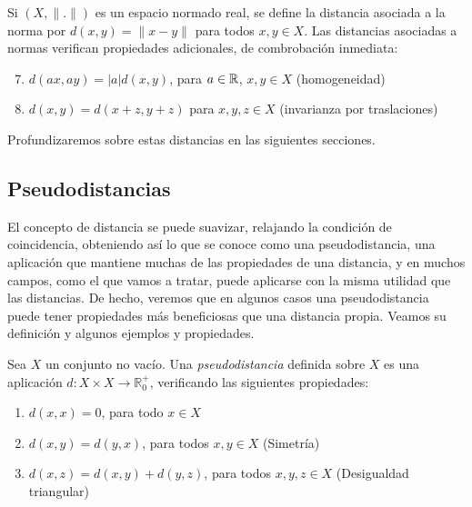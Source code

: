 \documentclass{book}
\begin{document}
\begin{example} \label{ex:dist:norm}
	Si $(X,\|.\|)$ es un espacio normado real, se define la distancia asociada a la norma por $d(x,y)=\|x-y\|$ para todos $x,y\in X$. Las distancias asociadas a normas verifican propiedades adicionales, de combrobación inmediata:
	\begin{enumerate}
		\setcounter{enumi}{6}
		\item $d(ax,ay) = |a|d(x,y)$, para $a \in \mathbb{R}$, $x,y \in X$ (homogeneidad) \label{item:dist:homogen}
		\item $d(x,y) = d(x+z,y+z)$ para $x,y,z \in X$ (invarianza por traslaciones) \label{item:dist:inv_tras}
	\end{enumerate}
	Profundizaremos sobre estas distancias en las siguientes secciones.
\end{example}

\subsection{Pseudodistancias}

El concepto de distancia se puede suavizar, relajando la condición de coincidencia, obteniendo así lo que se conoce como una pseudodistancia, una aplicación que mantiene muchas de las propiedades de una distancia, y en muchos campos, como el que vamos a tratar, puede aplicarse con la misma utilidad que las distancias. De hecho, veremos que en algunos casos una pseudodistancia puede tener propiedades más beneficiosas que una distancia propia. Veamos su definición y algunos ejemplos y propiedades.

\begin{definition}[Pseudodistancia]
	Sea $X$ un conjunto no vacío. Una \emph{pseudodistancia} definida sobre $X$ es una aplicación $d:X\times X \to \mathbb{R}^{+}_{0}$, verificando las siguientes propiedades:
	
	\begin{enumerate}
		\item $d(x,x)=0$, para todo $x \in X$ \label{item:pdist:coincid}
		\item $d(x,y)=d(y,x)$, para todos $x,y \in X$ (Simetría) \label{item:pdist:sim} 
		\item $d(x,z)=d(x,y)+d(y,z)$, para todos $x,y,z \in X$ (Desigualdad triangular) \label{item:pdist:triang}
	\end{enumerate}
	
\end{definition}
\end{document}
